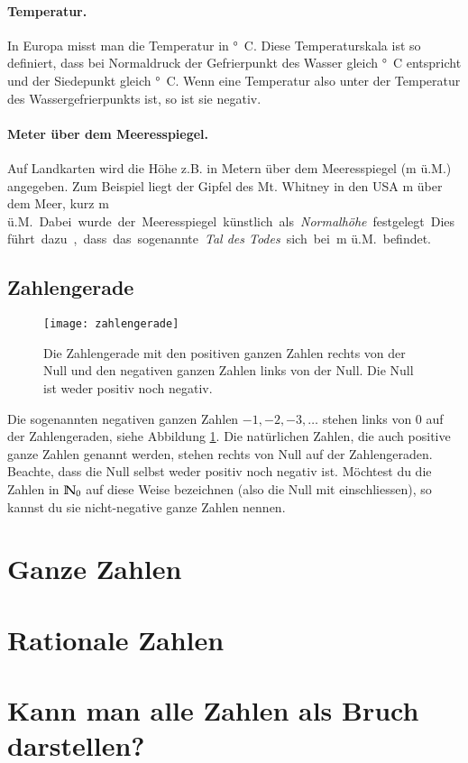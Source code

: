\paragraph{Temperatur.}
In Europa misst man die Temperatur in \unit{°C}.
Diese Temperaturskala ist so definiert, dass bei Normaldruck der Gefrierpunkt des Wasser gleich \unit[0]{°C} entspricht und der Siedepunkt gleich \unit[100]{°C}.
Wenn eine Temperatur also unter der Temperatur des Wassergefrierpunkts ist, so ist sie negativ.

\paragraph{Meter über dem Meeresspiegel.}
Auf Landkarten wird die Höhe z.B. in Metern über dem Meeresspiegel (m ü.M.) angegeben.
Zum Beispiel liegt der Gipfel des Mt. Whitney in den USA \unit[4418]{m} über dem Meer, kurz \unit[4418]{m ü.M.}
Dabei wurde der Meeresspiegel künstlich als \emph{Normalhöhe} festgelegt.
Dies führt dazu, dass das sogenannte \emph{Tal des Todes} sich bei \unit[-86]{m ü.M.} befindet.

\subsection{Zahlengerade}
\begin{figure}[H]
	\texttt{[image: zahlengerade]}
	\caption{Die Zahlengerade mit den positiven ganzen Zahlen rechts von der Null und den negativen ganzen Zahlen links von der Null.
	Die Null ist weder positiv noch negativ.}
	\label{fig:zahlengerade-pos-neg}
\end{figure}

Die sogenannten negativen ganzen Zahlen $-1, -2, -3, \ldots$ stehen links von 0 auf der Zahlengeraden, siehe Abbildung \ref{fig:zahlengerade-pos-neg}.
Die natürlichen Zahlen, die auch positive ganze Zahlen genannt werden, stehen rechts von Null auf der Zahlengeraden. Beachte, dass die Null selbst weder positiv noch negativ ist.
Möchtest du die Zahlen in $\mathbb{N}_0$ auf diese Weise bezeichnen (also die Null mit einschliessen), so kannst du sie nicht-negative ganze Zahlen nennen.

\section{Ganze Zahlen}
\section{Rationale Zahlen}
\section{Kann man alle Zahlen als Bruch darstellen?}

